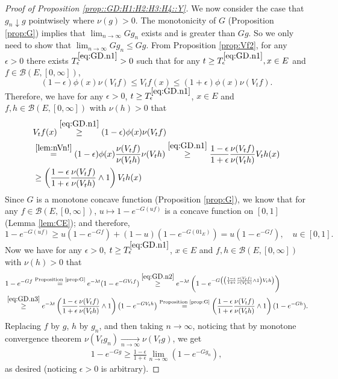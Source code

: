 \documentclass[12pt,a4paper]{amsart}
\numberwithin{equation}{section}
\theoremstyle{plain}
\theoremstyle{definition}
\theoremstyle{remark}
\begin{document}
\begin{proof}[Proof of Proposition \ref{prop::GD:H1:H2:H3:H4::Y}]
	We now consider the case that $g_n \downarrow g$ pointwisely %
	where $\nu(g) > 0$. %
	The monotonicity of $G$ (Proposition \ref{prop:G}) implies that $\lim_{n \to \infty} Gg_n$ exists and is greater %
	than $G g$.
	So we only need to show that $\lim_{n\to \infty} Gg_n \leq Gg$.
	From Proposition \ref{prop:Vf2}, for any $\epsilon>0$ there exists $T_\epsilon^{\eqref{eq:GD.n1}} >0$ such that for any $t\geq T_\epsilon^{\eqref{eq:GD.n1}}, x\in E$ and $f\in \mathcal B(E,[0,\infty])$,
\begin{equation} \label{eq:GD.n1}
	(1-\epsilon)\phi(x) \nu(V_tf)\leq V_tf(x)
	\leq (1+\epsilon)\phi(x) \nu(V_tf).
\end{equation}
	Therefore, we have for any $\epsilon>0$, $t \geq T_\epsilon^{\eqref{eq:GD.n1}}$, $x\in E$ and $f, h\in \mathcal B(E,[0,\infty])$ with $\nu(h) >0$ that
\begin{align}
	&V_tf(x)
	\overset{\eqref{eq:GD.n1}}\geq (1-\epsilon)\phi(x) \nu(V_tf)
	\\& \overset{\eqref{lem:nVn!}}= (1-\epsilon)\phi(x) \frac{\nu(V_tf)}{\nu(V_th)} \nu(V_th)
\overset{\eqref{eq:GD.n1}}\geq \frac{1-\epsilon}{1+\epsilon} \frac{\nu(V_tf)}{\nu(V_th)} V_th(x)
	\\ \label{eq:GD.n2} & \geq \left(\frac{1-\epsilon}{1+\epsilon} \frac{\nu(V_tf)}{\nu(V_th)} \wedge 1\right) V_th(x)
\end{align}
	Since $G$ is a monotone concave function (Proposition \ref{prop:G}), we know that for any $f\in \mathcal B(E,[0,\infty])$, $u \mapsto 1 - e^{-G(uf)}$ is a concave function on $[0,1]$ (Lemma \ref{lem:CE}); and therefore,
\begin{equation} \label{eq:GD.n3}
	1 - e^{- G(uf)}\geq u(1- e^{- Gf}) + (1-u) (1- e^{- G(0  1_E)}) = u(1- e^{- Gf}), \quad u \in [0,1].
\end{equation}
	Now we have for any $\epsilon>0$, $t \geq T_\epsilon^{\eqref{eq:GD.n1}}$, $x\in E$ and $f, h\in \mathcal B(E,[0,\infty])$ with $\nu(h) >0$ that
\begin{align}
	&1 - e^{-Gf}
	\overset{\text{Proposition \ref{prop:G}}}= e^{-\lambda t}(1- e^{- GV_t f})
	\overset{\eqref{eq:GD.n2}}\geq e^{-\lambda t}\left(1- e^{- G\left( \left(\frac{1-\epsilon}{1+\epsilon} \frac{\nu(V_tf)}{\nu(V_th)} \wedge 1\right) V_th\right) }\right)
	\\ &\overset{\eqref{eq:GD.n3}}\geq e^{-\lambda t} \left(\frac{1-\epsilon}{1+\epsilon} \frac{\nu(V_tf)}{\nu(V_th)} \wedge 1 \right) \left(1- e^{- GV_th }\right)
	\overset{\text{Proposition \ref{prop:G}}}= \left(\frac{1-\epsilon}{1+\epsilon} \frac{\nu(V_tf)}{\nu(V_th)} \wedge 1\right) (1 - e^{- Gh}).
\end{align}
	Replacing $f$ by $g$, $h$ by $g_n$, and then taking $n\to \infty$, noticing that by monotone convergence theorem $\nu(V_tg_n) \xrightarrow[n\to \infty]{} \nu(V_tg)$, we get
\begin{align}
	1 - e^{- Gg} \geq \frac{1 - \epsilon}{1+\epsilon}\lim_{n\to \infty}(1 - e^{- Gg_n}),
\end{align}
	as desired (noticing $\epsilon > 0$ is arbitrary).
\end{proof}
\end{document}
